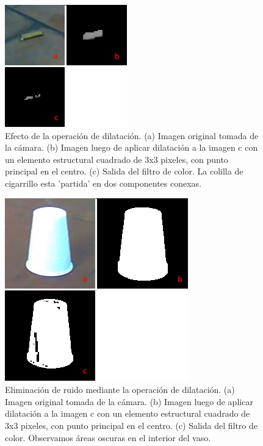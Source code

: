 \begin{figure}[tpb]
\begin{center}
  \includegraphics[scale=0.8]{vision/figures/dilate1.png}
\end{center}
  \caption[Efecto de la operaci\'on de dilataci\'on]{\small Efecto de la operaci\'on de dilataci\'on. (a)  Imagen original tomada de la c\'amara. (b) Imagen luego de aplicar dilataci\'on a la imagen c con un elemento estructural cuadrado de 3x3 pixeles, con punto principal en el centro. (c) Salida del filtro de color. La colilla de cigarrillo esta 'partida' en dos componentes conexas. } 
  \label{fig:dilate}
\end{figure}

\begin{figure}[tpb]
\begin{center}

  \includegraphics[scale=0.6]{vision/figures/dilate-ruido.png}
\end{center}
  \caption[Eliminaci\'on de ruido mediante dilataci\'on]{\small Eliminaci\'on de ruido mediante la operaci\'on de dilataci\'on. (a) Imagen original tomada de la c\'amara. (b) Imagen luego de aplicar dilataci\'on a la imagen c con un elemento estructural cuadrado de 3x3 pixeles, con punto principal en el centro. (c) Salida del filtro de color. Observamos \'areas  oscuras en el interior del vaso. }
  \label{fig:dilate-ruido}
\end{figure}

